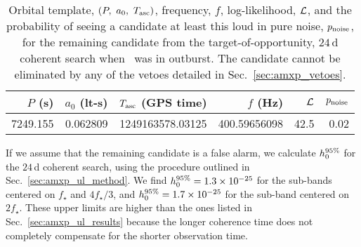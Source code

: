\begin{subappendices}
\begin{table*}
	\centering
	\caption{Orbital template, $(P,\ a_0,\ \tasc)$, frequency, $f$, log-likelihood, $\mathcal{L}$, and the probability of seeing a candidate at least this loud in pure noise, $p_{\rm noise}$, for the remaining candidate from the target-of-opportunity, $24\,$d coherent search when \sax\ was in outburst. The candidate cannot be eliminated by any of the vetoes detailed in Sec.~\ref{sec:amxp_vetoes}. \label{tab:shortsaxoutliers}}
	\begin{tabular}{r r r r r r}
	\toprule
		\textrm{$P$ (s)} & \textrm{$a_0$ (lt-s)} & \textrm{$T_{\textrm{asc}}$ (GPS time)} & \textrm{$f$ (Hz)} & \textrm{$\mathcal{L}$} & \textrm{$p_{\rm noise}$} \\
	\midrule
	7249.155 & 0.062809 & 1249163578.03125 & 400.59656098 & 42.5 & 0.02 \\
	\bottomrule
	\end{tabular}
\end{table*}
	
If we assume that the remaining candidate is a false alarm, we calculate $h_0^{95\%}$ for the $24\,$d coherent search, using the procedure outlined in Sec.~\ref{sec:amxp_ul_method}. We find $h_0^{95\%} = 1.3\times 10^{-25}$ for the sub-bands centered on $f_\star$ and $4f_\star/3$, and $h_0^{95\%} = 1.7\times 10^{-25}$ for the sub-band centered on $2f_\star$. These upper limits are higher than the ones listed in Sec.~\ref{sec:amxp_ul_results} because the longer coherence time does not completely compensate for the shorter observation time.


\end{subappendices}
